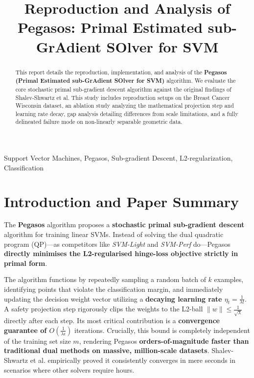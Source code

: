 \documentclass[conference]{IEEEtran}
\begin{document}
\title{Reproduction and Analysis of Pegasos: Primal Estimated sub-GrAdient SOlver for SVM}

\author{
}

\maketitle

\begin{abstract}
This report details the reproduction, implementation, and analysis of the \textbf{Pegasos (Primal Estimated sub-GrAdient SOlver for SVM)} algorithm. We evaluate the core stochastic primal sub-gradient descent algorithm against the original findings of Shalev-Shwartz et al. This study includes reproduction setups on the Breast Cancer Wisconsin dataset, an ablation study analyzing the mathematical projection step and learning rate decay, gap analysis detailing differences from scale limitations, and a fully delineated failure mode on non-linearly separable geometric data.
\end{abstract}

\begin{IEEEkeywords}
Support Vector Machines, Pegasos, Sub-gradient Descent, L2-regularization, Classification
\end{IEEEkeywords}

\section{Introduction and Paper Summary}
The \textbf{Pegasos} algorithm proposes a \textbf{stochastic primal sub-gradient descent} algorithm for training linear SVMs. Instead of solving the dual quadratic program (QP)---as competitors like \textit{SVM-Light} and \textit{SVM-Perf} do---Pegasos \textbf{directly minimises the L2-regularised hinge-loss objective strictly in primal form}. 

The algorithm functions by repeatedly sampling a random batch of $k$ examples, identifying points that violate the classification margin, and immediately updating the decision weight vector utilizing a \textbf{decaying learning rate $\eta_t = \frac{1}{\lambda t}$}. A safety projection step rigorously clips the weights to the L2-ball $\|w\| \leq \frac{1}{\sqrt{\lambda}}$ directly after each step. Its most critical contribution is a \textbf{convergence guarantee of $O\left(\frac{1}{\lambda \epsilon}\right)$} iterations. Crucially, this bound is completely independent of the training set size $m$, rendering Pegasos \textbf{orders-of-magnitude faster than traditional dual methods on massive, million-scale datasets}. Shalev-Shwartz et al. empirically proved it consistently converges in mere seconds in scenarios where other solvers require hours.
\end{document}
